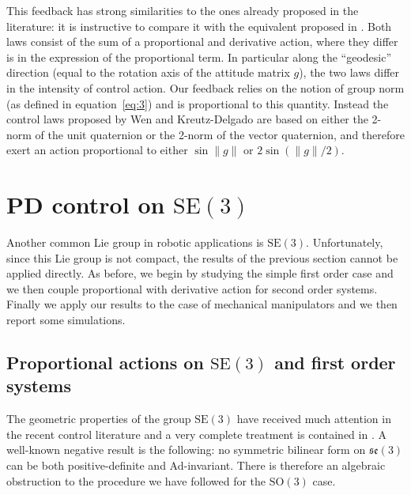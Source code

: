 \documentclass[10pt,twocolumn]{article}
\newcommand{\SO}{\mathrm{SO}}
\newcommand{\SE}{\mathrm{SE}}
\newcommand{\se}{\mathfrak{se}}
\begin{document}
This feedback has strong similarities to the ones already proposed in the literature: it is instructive to compare it with the equivalent proposed in \cite{13}. Both laws consist of the sum of a proportional and derivative action, where they differ is in the expression of the proportional term. In particular along the ``geodesic'' direction (equal to the rotation axis of the attitude matrix $g$), the two laws differ in the intensity of control action. Our feedback relies on the notion of group norm (as defined in equation~\eqref{eq:3}) and is proportional to this quantity. Instead the control laws proposed by Wen and Kreutz-Delgado are based on either the 2-norm of the unit quaternion or the 2-norm of the vector quaternion, and therefore exert an action proportional to either $\sin\|g\|$ or $2\sin(\|g\|/2)$.

\section{PD control on $\SE(3)$}\label{sec:pd-se3}
Another common Lie group in robotic applications is $\SE(3)$. Unfortunately, since this Lie group is not compact, the results of the previous section cannot be applied directly. As before, we begin by studying the simple first order case and we then couple proportional with derivative action for second order systems. Finally we apply our results to the case of mechanical manipulators and we then report some simulations.

\subsection{Proportional actions on $\SE(3)$ and first order systems}\label{subsec:proportional-se3}
The geometric properties of the group $\SE(3)$ have received much attention in the recent control literature \cite{3,1} and a very complete treatment is contained in \cite{15}. A well-known negative result is the following: no symmetric bilinear form on $\se(3)$ can be both positive-definite and Ad-invariant. There is therefore an algebraic obstruction to the procedure we have followed for the $\SO(3)$ case.
\end{document}
